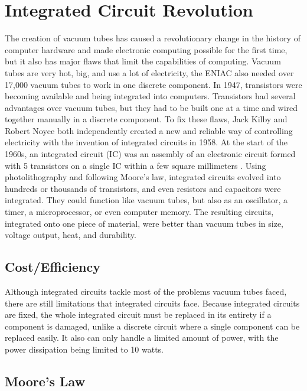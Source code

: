 \documentclass[letterpaper, 10 pt, conference]{IEEEconf}
\begin{document}

\section{Integrated Circuit Revolution}

The creation of vacuum tubes has caused a revolutionary change in the history of computer hardware and made electronic computing possible for the first time, but it also has major flaws that limit the capabilities of computing. Vacuum tubes are very hot, big, and use a lot of electricity, the ENIAC also needed over 17,000 vacuum tubes to work in one discrete component. In 1947, transistors were becoming available and being integrated into computers. Transistors had several advantages over vacuum tubes, but they had to be built one at a time and wired together manually in a discrete component. To fix these flaws, Jack Kilby and Robert Noyce both independently created a new and reliable way of controlling electricity with the invention of integrated circuits in 1958. At the start of the 1960s, an integrated circuit (IC) was an assembly of an electronic circuit formed with 5 transistors on a single IC within a few square millimeters . Using photolithography and following Moore’s law, integrated circuits evolved into hundreds or thousands of transistors, and even resistors and capacitors were integrated. They could function like vacuum tubes, but also as an oscillator, a timer, a microprocessor, or even computer memory. The resulting circuits, integrated onto one piece of material, were better than vacuum tubes in size, voltage output, heat, and durability.

\subsection{Cost/Efficiency}
Although integrated circuits tackle most of the problems vacuum tubes faced, there are still limitations that integrated circuits face. Because integrated circuits are fixed, the whole integrated circuit must be replaced in its entirety if a component is damaged, unlike a discrete circuit where a single component can be replaced easily. It also can only handle a limited amount of power, with the power dissipation being limited to 10 watts. 

\subsection{Moore's Law}
\end{document}
